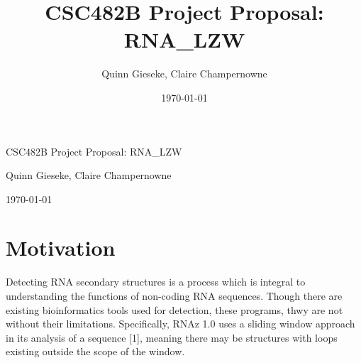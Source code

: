 \documentclass[letterpaper, 12pt]{artikel3}
\title{CSC482B Project Proposal: RNA\_LZW}
\date{\today}
\author{Quinn Gieseke, Claire Champernowne}
\begin{document}

\Huge{CSC482B Project Proposal: RNA\_LZW}

\large{Quinn Gieseke, Claire Champernowne}

\large{\today}
\normalsize









\vspace{-7mm}
\section*{Motivation}
Detecting RNA secondary structures is a process which is integral to understanding the functions of non-coding RNA sequences. Though there are existing bioinformatics tools used for detection, these programs, thwy are not without their limitations.  Specifically,  RNAz 1.0 uses a sliding window approach in its analysis of a sequence [1], meaning there may be structures with loops existing outside the scope of the window. 
\end{document}
